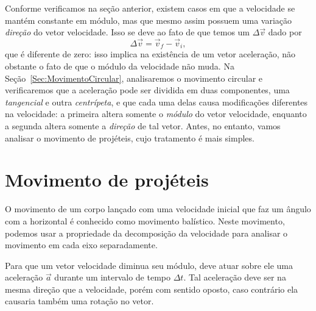 Conforme verificamos na seção anterior, existem casos em que a velocidade se mantém constante em módulo, mas que mesmo assim possuem uma variação \emph{direção} do vetor velocidade. Isso se deve ao fato de que temos um $\Delta \vec{v}$ dado por
\begin{equation}
	\Delta \vec{v} = \vec{v}_f - \vec{v}_i,
\end{equation}
%
que é diferente de zero: isso implica na existência de um vetor aceleração, não obstante o fato de que o módulo da velocidade não muda. Na Seção~\eqref{Sec:MovimentoCircular}, analisaremos o movimento circular e verificaremos que a aceleração pode ser dividida em duas componentes, uma \emph{tangencial} e outra \emph{centrípeta}, e que cada uma delas causa modificações diferentes na velocidade: a primeira altera somente o \emph{módulo} do vetor velocidade, enquanto a segunda altera somente a \emph{direção} de tal vetor. Antes, no entanto, vamos analisar o movimento de projéteis, cujo tratamento é mais simples.

\section{Movimento de projéteis}

O movimento de um corpo lançado com uma velocidade inicial que faz um ângulo com a horizontal é conhecido como movimento balístico. Neste movimento, podemos usar a propriedade da decomposição da velocidade para analisar o movimento em cada eixo separadamente.

\begin{marginfigure}
\centering
{}
\caption{Para que um vetor velocidade diminua seu módulo, deve atuar sobre ele uma aceleração $\vec{a}$ durante um intervalo de tempo $\Delta t$. Tal aceleração deve ser na mesma direção que a velocidade, porém com sentido oposto, caso contrário ela causaria também uma rotação no vetor.}
\end{marginfigure}

